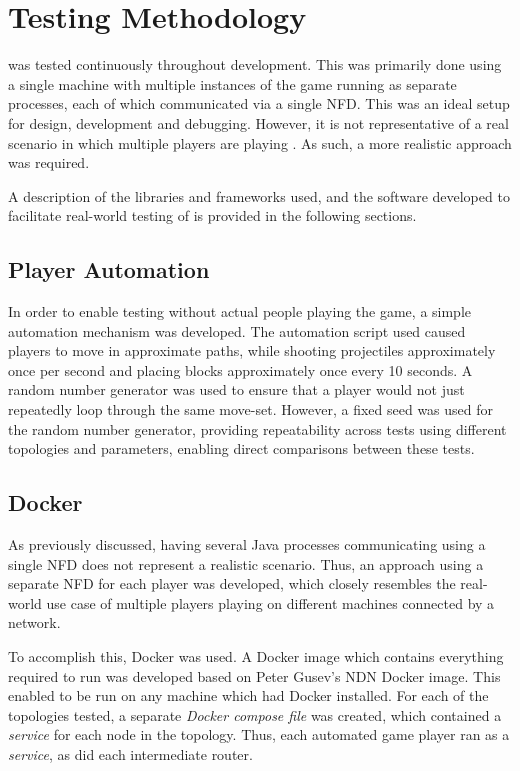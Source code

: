\section{Testing Methodology}
\game{} was tested continuously throughout development. This was primarily done using a single machine with multiple instances of the game running as separate processes, each of which communicated via a single NFD. This was an ideal setup for design, development and debugging. However, it is not representative of a real scenario in which multiple players are playing \game{}. As such, a more realistic approach was required. 

A description of the libraries and frameworks used, and the software developed to facilitate real-world testing of \game{} is provided in the following sections.



\subsection{Player Automation}\label{sec:impl:automation}
In order to enable testing without actual people playing the game, a simple automation mechanism was developed. The automation script used caused players to move in approximate paths, while shooting projectiles approximately once per second and placing blocks approximately once every 10 seconds. A random number generator was used to ensure that a player would not just repeatedly loop through the same move-set. However, a fixed seed was used for the random number generator, providing repeatability across tests using different topologies and parameters, enabling direct comparisons between these tests. 


\subsection{Docker}\label{sec:impl:test:docker}
As previously discussed, having several Java processes communicating using a single NFD does not represent a realistic scenario. Thus, an approach using a separate NFD for each player was developed, which closely resembles the real-world use case of multiple players playing on different machines connected by a network.

To accomplish this, Docker was used. A Docker image which contains everything required to run \game{} was developed based on Peter Gusev's \cite{docker-ndn} NDN Docker image. This enabled \game{} to be run on any machine which had Docker installed. For each of the topologies tested, a separate \textit{Docker compose file} was created, which contained a \textit{service} for each node in the topology. Thus, each automated game player ran as a \textit{service}, as did each intermediate router.

